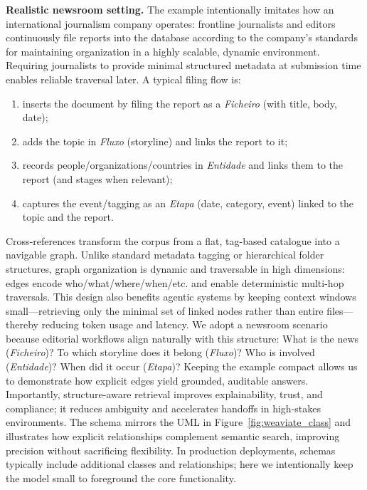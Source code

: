 \noindent\textbf{Realistic newsroom setting.} The example intentionally imitates how an international journalism company operates: frontline journalists and editors continuously file reports into the database according to the company's standards for maintaining organization in a highly scalable, dynamic environment. Requiring journalists to provide minimal structured metadata at submission time enables reliable traversal later. A typical filing flow is:
\begin{enumerate}
    \item inserts the document by filing the report as a \textit{Ficheiro} (with title, body, date);
    \item adds the topic in \textit{Fluxo} (storyline) and links the report to it;
    \item records people/organizations/countries in \textit{Entidade} and links them to the report (and stages when relevant);
    \item captures the event/tagging as an \textit{Etapa} (date, category, event) linked to the topic and the report.
\end{enumerate}

Cross-references transform the corpus from a flat, tag-based catalogue into a navigable graph. Unlike standard metadata tagging or hierarchical folder structures, graph organization is dynamic and traversable in high dimensions: edges encode who/what/where/when/etc. and enable deterministic multi-hop traversals. This design also benefits agentic systems by keeping context windows small—retrieving only the minimal set of linked nodes rather than entire files—thereby reducing token usage and latency. We adopt a newsroom scenario because editorial workflows align naturally with this structure: What is the news (\textit{Ficheiro})? To which storyline does it belong (\textit{Fluxo})? Who is involved (\textit{Entidade})? When did it occur (\textit{Etapa})? Keeping the example compact allows us to demonstrate how explicit edges yield grounded, auditable answers. Importantly, structure-aware retrieval improves explainability, trust, and compliance; it reduces ambiguity and accelerates handoffs in high-stakes environments. The schema mirrors the UML in Figure~\ref{fig:weaviate_class} and illustrates how explicit relationships complement semantic search, improving precision without sacrificing flexibility. In production deployments, schemas typically include additional classes and relationships; here we intentionally keep the model small to foreground the core functionality.


